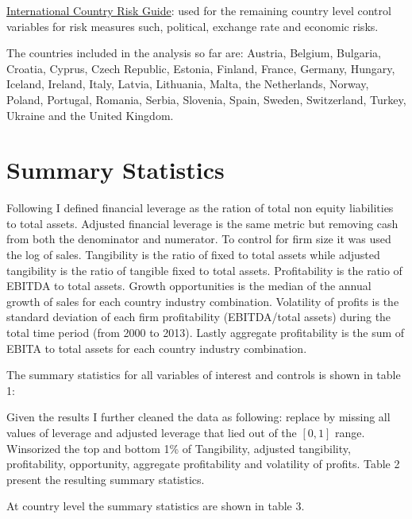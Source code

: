 \documentclass[12pt,runningheads]{article}
\begin{document}
\underline{International Country Risk Guide}: used for the remaining country level control variables for risk measures such, political, exchange rate and economic risks.

The countries included in the analysis so far are: Austria, Belgium, Bulgaria, Croatia, Cyprus, Czech Republic, Estonia, Finland, France, Germany, Hungary, Iceland, Ireland, Italy, Latvia, Lithuania, Malta, the Netherlands, Norway, Poland, Portugal, Romania, Serbia, Slovenia, Spain, Sweden, Switzerland, Turkey, Ukraine and the United Kingdom.

\break 

\section{Summary Statistics}

Following \cite*{huizinga2008capital} I defined financial leverage as the ration of total non equity liabilities to total assets. Adjusted financial leverage is the same metric but removing cash from both the denominator and numerator. To control for firm size it was used the log of sales. Tangibility is the ratio of fixed to total assets while adjusted tangibility is the ratio of tangible fixed to total assets. Profitability is the ratio of EBITDA to total assets. Growth opportunities is the median of the annual growth of sales for each country industry combination. Volatility of profits is the standard deviation of each firm profitability (EBITDA/total assets) during the total time period (from 2000 to 2013). Lastly aggregate profitability is the sum of EBITA to total assets for each country industry combination.

The summary statistics for all variables of interest and controls is shown in table 1:


Given the results I further cleaned the data as following: replace by missing all values of leverage and adjusted leverage that lied out of the $[0,1]$ range. Winsorized the top and bottom 1\% of Tangibility, adjusted tangibility, profitability, opportunity, aggregate profitability and volatility of profits. Table 2 present the resulting summary statistics.


At country level the summary statistics are shown in table 3.

\end{document}
